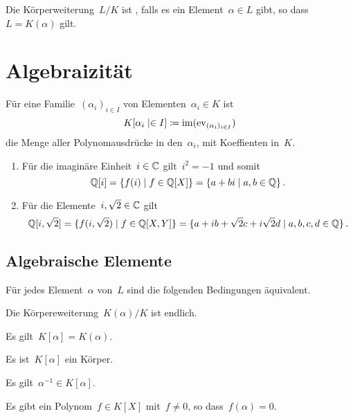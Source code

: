 \begin{definition}
  Die Körperweiterung~$L/K$ ist , falls es ein Element~$\alpha \in L$ gibt, so dass~$L = K(\alpha)$ gilt.
\end{definition}




\section{Algebraizität}

Für eine Familie~$(\alpha_i)_{i \in I}$ von Elementen~$\alpha_i \in K$ ist
\[
  K[\alpha_i \suchthat \in I]
  \defined
  \im( \ev_{(\alpha_i)_{i \in I}} )
\]
die Menge aller Polynomausdrücke in den~$\alpha_i$, mit Koeffienten in~$K$.

\begin{example}
  \leavevmode
  \begin{enumerate}
    \item
      Für die imaginäre Einheit~$i \in \mathbb{C}$ gilt~$i^2 = -1$ und somit
      \[
        \Rational[i]
        =
        \{
          f(i)
        \suchthat
          f \in \Rational[X]
        \}
        =
        \{
          a + b i
        \suchthat
          a, b \in \Rational
        \} \,.
      \]
    \item
      Für die Elemente~$i, \sqrt{2} \in \mathbb{C}$ gilt
      \[
        \Rational[i, \sqrt{2}]
        =
        \{
          f(i, \sqrt{2})
        \suchthat
          f \in \Rational[X, Y]
        \}
        =
        \{
          a + i b + \sqrt{2} c + i \sqrt{2} d
        \suchthat
          a, b, c, d \in \Rational
        \} \,.
      \]
  \end{enumerate}
\end{example}


\subsection{Algebraische Elemente}

\begin{proposition}
  \label{characterizations of algebraic elements}
  Für jedes Element~$\alpha$ von~$L$ sind die folgenden Bedingungen äquivalent.
  \begin{equivlist}
    \item
      Die Körpereweiterung~$K(\alpha)/K$ ist endlich.
    \item
      Es gilt~$K[\alpha] = K(\alpha)$.
    \item
      Es ist~$K[\alpha]$ ein Körper.
    \item
      Es gilt~$\alpha^{-1} \in K[\alpha]$.
    \item
      Es gibt ein Polynom~$f \in K[X]$ mit~$f \neq 0$, so dass~$f(\alpha) = 0$.
  \end{equivlist}
\end{proposition}

